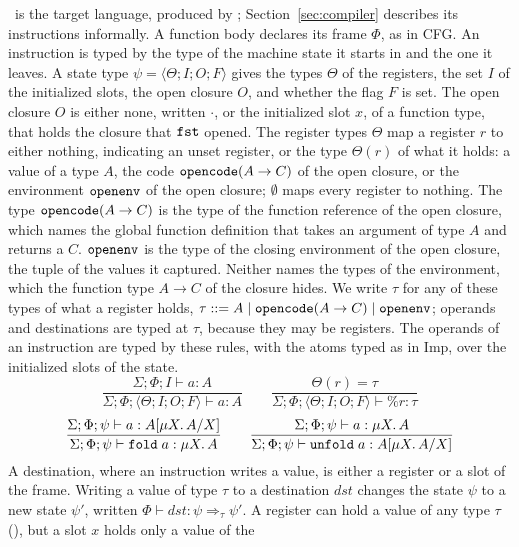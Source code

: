 \instr\ is the target language, produced by ;
Section~\ref{sec:compiler} describes its instructions informally. A function
body declares its frame $\Phi$, as in CFG. An instruction is typed by the type
of the machine state it starts in and the one it leaves. A state type
$\psi = \langle \Theta; I; O; F \rangle$ gives the types $\Theta$ of the
registers, the set $I$ of the initialized slots, the open closure $O$, and
whether the flag $F$ is set. The open closure $O$ is either none, written
$\cdot$, or the initialized slot $x$, of a function type, that holds the
closure that $\mathtt{fst}$ opened. The register types $\Theta$ map a register $r$
to either nothing, indicating an unset register, or the type $\Theta(r)$ of
what it holds: a value of a type $A$, the code
$\mathtt{opencode}(A \rightarrow C)$ of the open closure, or the environment
$\mathtt{openenv}$ of the open closure; $\emptyset$ maps every register to
nothing. The type $\mathtt{opencode}(A \rightarrow C)$ is the type of the function
reference of the open closure, which names the global function definition
that takes an argument of type $A$ and returns a $C$.
$\mathtt{openenv}$ is the type of the closing environment of the open closure, the
tuple of the values it captured. Neither names the types of the environment,
which the function type $A \rightarrow C$ of the closure hides. We write $\tau$
for any of these types of what a register holds,
$\tau ::= A \mid \mathtt{opencode}(A \rightarrow C) \mid \mathtt{openenv}$; operands
and destinations are typed at $\tau$, because they may be registers. The operands
of an instruction are typed by these rules, with the atoms typed as in Imp,
over the initialized slots of the state.
{\small\figdefs
{}
\[
  \dfrac{\Sigma; \Phi; I \vdash a : A}{\Sigma; \Phi; \langle \Theta; I; O; F \rangle \vdash a : A}
  \qquad
  \dfrac{\Theta(r) = \tau}{\Sigma; \Phi; \langle \Theta; I; O; F \rangle \vdash \%r : \tau}
\]
\[
  \dfrac{\Sigma; \Phi; \psi \vdash a : A[\mu X.\, A / X]}{\Sigma; \Phi; \psi \vdash \mathtt{fold}\;a : \mu X.\, A}
  \qquad
  \dfrac{\Sigma; \Phi; \psi \vdash a : \mu X.\, A}{\Sigma; \Phi; \psi \vdash \mathtt{unfold}\;a : A[\mu X.\, A / X]}
\]
}
A destination, where an instruction writes a value, is either a register or a
slot of the frame. Writing a value of type $\tau$ to a destination $\mathit{dst}$ changes
the state $\psi$ to a new state $\psi'$, written
$\Phi \vdash \mathit{dst} : \psi \Rightarrow_\tau \psi'$. A register can hold a value of
any type $\tau$ (), but a slot $x$ holds only a value of the

